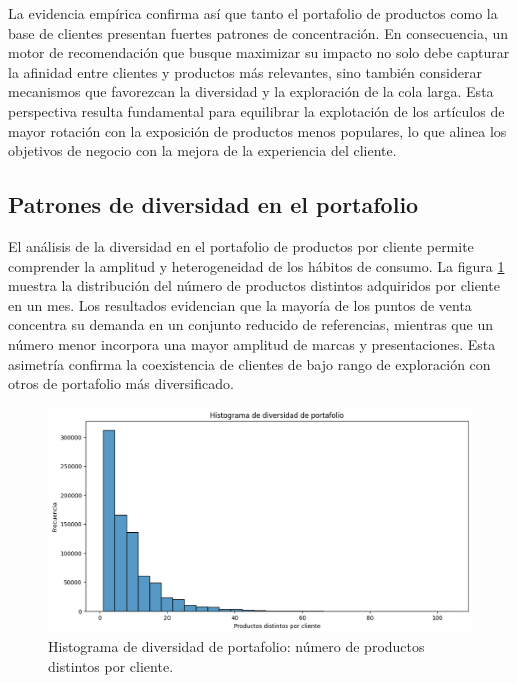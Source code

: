 La evidencia empírica confirma así que tanto el portafolio de productos como la base de clientes presentan fuertes patrones de concentración. En consecuencia, un motor de recomendación que busque maximizar su impacto no solo debe capturar la afinidad entre clientes y productos más relevantes, sino también considerar mecanismos que favorezcan la diversidad y la exploración de la cola larga. Esta perspectiva resulta fundamental para equilibrar la explotación de los artículos de mayor rotación con la exposición de productos menos populares, lo que alinea los objetivos de negocio con la mejora de la experiencia del cliente.

\subsection{Patrones de diversidad en el portafolio}

El análisis de la diversidad en el portafolio de productos por cliente permite comprender la amplitud y heterogeneidad de los hábitos de consumo. La figura \ref{fig:hist_diversidad} muestra la distribución del número de productos distintos adquiridos por cliente en un mes. Los resultados evidencian que la mayoría de los puntos de venta concentra su demanda en un conjunto reducido de referencias, mientras que un número menor incorpora una mayor amplitud de marcas y presentaciones. Esta asimetría confirma la coexistencia de clientes de bajo rango de exploración con otros de portafolio más diversificado.

\begin{figure}[htpb]
	\centering
	\includegraphics[scale=.52]{./Figures/hist_diversidad.png}
	\caption{Histograma de diversidad de portafolio: número de productos distintos por cliente.}
	\label{fig:hist_diversidad}
\end{figure}

